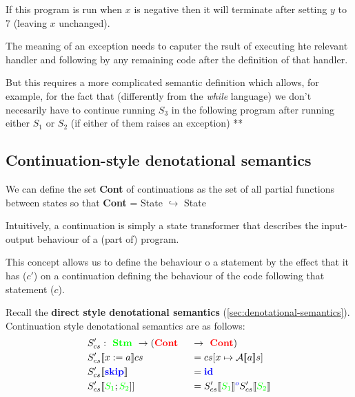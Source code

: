 \documentclass[11pt,a4paper,titlepage,dvipsnames,cmyk]{scrartcl}
\newcommand\pfun{\hookrightarrow}
\begin{document}
If this program is run when $x$ is negative then it will terminate after
setting $y$ to 7 (leaving $x$ unchanged).

The meaning of an exception needs to caputer the rsult of executing hte
relevant handler and following by any remaining code after the definition
of that handler.

But this requires a more complicated semantic definition which allows, for
example, for the fact that (differently from the \textit{while} language)
we don't necesarily have to continue running $S_3$ in the following
program after running either $S_1$ or $S_2$ (if either of them raises an
exception) ** %

\subsection{Continuation-style denotational semantics}%
\label{sub:continuation-style}
We can define the set {\color{red}\textbf{Cont}} of continuations as the
set of all partial functions between states so that
{\color{red}\textbf{Cont}} = {\color{red}State} $\pfun$ {\color{red}State}

Intuitively, a continuation is simply a state transformer that describes
the input-output behaviour of a (part of) program.

This concept allows us to define the behaviour o a statement  by the
effect that it has ($c'$) on a continuation defining the behaviour of the
code following that statement ($c$).

Recall the \textbf{direct style denotational semantics}
(\ref{sec:denotational-semantics}). Continuation style denotational
semantics are as follows:
\begin{alignat*}{2}
    &S'_{cs} : {\color{green}\textbf{ Stm }} \rightarrow (
    {\color{red}\textbf{Cont }} &&\rightarrow {\color{red}\textbf{ Cont}}) \\
    &S'_{cs} [\![x:=a]\!]c s &&= c s [x \mapsto \mathcal{A}[\![a]\!]s] \\
    &S'_{cs} [\![ {\color{blue}\textbf{skip}}]\!] &&=
    {\color{blue}\textbf{id}} \\
    &S'_{cs}[\![ {\color{green}S_1}; {\color{green}S_2} ]] &&= S'_{cs}[\![
    {\color{green}S_1} ]\!] ^ {\color{blue}o} S'_{cs} [\![
    {\color{green}S_2} ]\!] \\
\end{alignat*}
\end{document}

